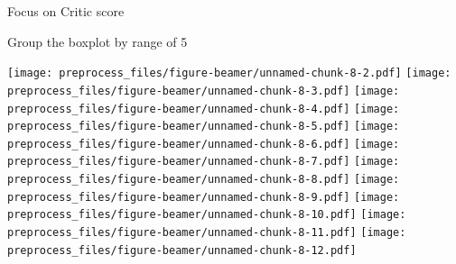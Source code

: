 \documentclass[ignorenonframetext,]{beamer}
\newenvironment{Shaded}{\begin{snugshade}}{\end{snugshade}}
\newcommand{\ControlFlowTok}[1]{\textcolor[rgb]{0.13,0.29,0.53}{\textbf{#1}}}
\newcommand{\DataTypeTok}[1]{\textcolor[rgb]{0.13,0.29,0.53}{#1}}
\newcommand{\DecValTok}[1]{\textcolor[rgb]{0.00,0.00,0.81}{#1}}
\newcommand{\FloatTok}[1]{\textcolor[rgb]{0.00,0.00,0.81}{#1}}
\newcommand{\KeywordTok}[1]{\textcolor[rgb]{0.13,0.29,0.53}{\textbf{#1}}}
\newcommand{\NormalTok}[1]{#1}
\newcommand{\OperatorTok}[1]{\textcolor[rgb]{0.81,0.36,0.00}{\textbf{#1}}}
\newcommand{\OtherTok}[1]{\textcolor[rgb]{0.56,0.35,0.01}{#1}}
\newcommand{\StringTok}[1]{\textcolor[rgb]{0.31,0.60,0.02}{#1}}
\begin{document}
\begin{frame}[fragile]{Focus on Critic score}
\begin{block}{Group the boxplot by range of 5}
\begin{Shaded}
\end{Shaded}

\texttt{[image: preprocess\_files/figure-beamer/unnamed-chunk-8-2.pdf]}
\texttt{[image: preprocess\_files/figure-beamer/unnamed-chunk-8-3.pdf]}
\texttt{[image: preprocess\_files/figure-beamer/unnamed-chunk-8-4.pdf]}
\texttt{[image: preprocess\_files/figure-beamer/unnamed-chunk-8-5.pdf]}
\texttt{[image: preprocess\_files/figure-beamer/unnamed-chunk-8-6.pdf]}
\texttt{[image: preprocess\_files/figure-beamer/unnamed-chunk-8-7.pdf]}
\texttt{[image: preprocess\_files/figure-beamer/unnamed-chunk-8-8.pdf]}
\texttt{[image: preprocess\_files/figure-beamer/unnamed-chunk-8-9.pdf]}
\texttt{[image: preprocess\_files/figure-beamer/unnamed-chunk-8-10.pdf]}
\texttt{[image: preprocess\_files/figure-beamer/unnamed-chunk-8-11.pdf]}
\texttt{[image: preprocess\_files/figure-beamer/unnamed-chunk-8-12.pdf]}

\end{block}

\end{frame}
\end{document}
